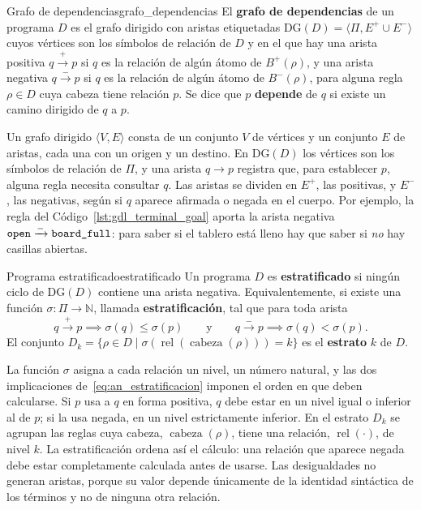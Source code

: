 \begin{definicion}{Grafo de dependencias}{grafo_dependencias}
El \textbf{grafo de dependencias} de un programa $D$ es el grafo dirigido con aristas etiquetadas $\mathrm{DG}(D) = \langle \Pi, E^+ \cup E^- \rangle$ cuyos vértices son los símbolos de relación de $D$ y en el que hay una arista positiva $q \xrightarrow{+} p$ si $q$ es la relación de algún átomo de $B^+(\rho)$, y una arista negativa $q \xrightarrow{-} p$ si $q$ es la relación de algún átomo de $B^-(\rho)$, para alguna regla $\rho \in D$ cuya cabeza tiene relación $p$. Se dice que $p$ \textbf{depende} de $q$ si existe un camino dirigido de $q$ a $p$.
\end{definicion}

Un grafo dirigido $\langle V, E \rangle$ consta de un conjunto $V$ de vértices y un conjunto $E$ de aristas, cada una con un origen y un destino. En $\mathrm{DG}(D)$ los vértices son los símbolos de relación de $\Pi$, y una arista $q \to p$ registra que, para establecer $p$, alguna regla necesita consultar $q$. Las aristas se dividen en $E^+$, las positivas, y $E^-$, las negativas, según si $q$ aparece afirmada o negada en el cuerpo. Por ejemplo, la regla  del Código~\ref{lst:gdl_terminal_goal} aporta la arista negativa $\texttt{open} \xrightarrow{-} \texttt{board\_full}$: para saber si el tablero está lleno hay que saber si \emph{no} hay casillas abiertas.

\begin{definicion}{Programa estratificado}{estratificado}
Un programa $D$ es \textbf{estratificado} si ningún ciclo de $\mathrm{DG}(D)$ contiene una arista negativa. Equivalentemente, si existe una función $\sigma : \Pi \to \mathbb N$, llamada \textbf{estratificación}, tal que para toda arista
\begin{equation}
    q \xrightarrow{+} p \implies \sigma(q) \le \sigma(p)
    \qquad\text{y}\qquad
    q \xrightarrow{-} p \implies \sigma(q) < \sigma(p).
    \label{eq:an_estratificacion}
\end{equation}
El conjunto $D_k = \{\rho \in D \mid \sigma(\operatorname{rel}(\operatorname{cabeza}(\rho))) = k\}$ es el \textbf{estrato} $k$ de $D$.
\end{definicion}

La función $\sigma$ asigna a cada relación un nivel, un número natural, y las dos implicaciones de~\eqref{eq:an_estratificacion} imponen el orden en que deben calcularse. Si $p$ usa a $q$ en forma positiva, $q$ debe estar en un nivel igual o inferior al de $p$; si la usa negada, en un nivel estrictamente inferior. En el estrato $D_k$ se agrupan las reglas cuya cabeza, $\operatorname{cabeza}(\rho)$, tiene una relación, $\operatorname{rel}(\cdot)$, de nivel $k$. La estratificación ordena así el cálculo: una relación que aparece negada debe estar completamente calculada antes de usarse. Las desigualdades  no generan aristas, porque su valor depende únicamente de la identidad sintáctica de los términos y no de ninguna otra relación.

